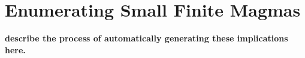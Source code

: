 \chapter{Enumerating Small Finite Magmas}

{\bf describe the process of automatically generating these implications here.}
